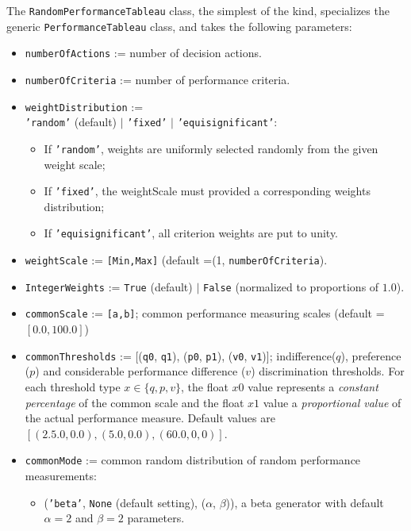 The {\tt RandomPerformanceTableau} class, the simplest of the kind, specializes the generic {\tt PerformanceTableau} class, and takes the following parameters:
\begin{itemize}[leftmargin=0.5cm,rightmargin=0.5cm]
\item \texttt{numberOfActions} := number of decision actions.
\item \texttt{numberOfCriteria} := number of performance criteria.
\item \texttt{weightDistribution} := \\
   \texttt{'random'} (default) $|$ \texttt{'fixed'} $|$ \texttt{'equisignificant'}:
      \begin{itemize}[rightmargin=1cm]
         \item If \texttt{'random'}, weights are uniformly selected randomly from the given weight scale;
         \item If \texttt{'fixed'}, the weightScale must provided a corresponding weights distribution;
         \item If \texttt{'equisignificant'}, all criterion weights are put to unity.
      \end{itemize}
\item \texttt{weightScale} := \texttt{[Min,Max]} (default =(1, \texttt{numberOfCriteria}).
\item \texttt{IntegerWeights} := \texttt{True} (default) $|$ \texttt{False} (normalized to proportions of $1.0$).
\item \texttt{commonScale} := \texttt{[a,b]}; common performance measuring scales (default = $[0.0,100.0]$)
\item \texttt{commonThresholds} := [(\texttt{q0}, \texttt{q1}), (\texttt{p0}, \texttt{p1}), (\texttt{v0}, \texttt{v1})]; indifference($q$), preference ($p$) and considerable performance difference ($v$) discrimination thresholds. For each threshold type $x \in \{q,p,v\}$, the float $x0$ value represents a \emph{constant percentage} of the common scale and the float $x1$ value a \emph{proportional value} of the actual performance measure. Default values are $[(2.5.0,0.0), (5.0,0.0), (60.0,0,0)]$. 
\item \texttt{commonMode} := common random distribution of random performance measurements:
      \begin{itemize}[rightmargin=1cm]
         \item (\texttt{'beta'}, \texttt{None} (default setting), ($\alpha$, $\beta$)), a beta generator with default $\alpha=2$ and $\beta=2$ parameters.

\end{itemize}
\end{itemize}
